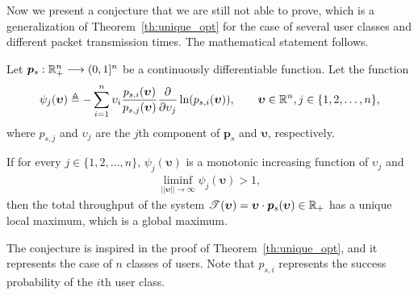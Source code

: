 Now we present a conjecture that we are still not able to prove, which is a generalization of Theorem~\ref{th:unique_opt} for the case of several user classes and different packet transmission times.
%
The mathematical statement follows.

\begin{conjecture} \label{conj:unique_opt}
    Let $\bm{p}_s: {\mathbb R}_+^n \longrightarrow (0,1]^n$ be a continuously differentiable function.
    Let the function
    \begin{align*}
        \psi_j(\bm{\upsilon}) \triangleq - \sum_{i=1}^n \upsilon_i \frac{p_{s,i}(\bm{\upsilon})}{p_{s,j}(\bm{\upsilon})} \frac{\partial}{\partial \upsilon_j} \ln(p_{s,i}(\bm{\upsilon})), \qquad \bm{\upsilon}\in{\mathbb R}^n, j\in\{1,2,\dots,n\},
    \end{align*}
    where $p_{s,j}$ and $\upsilon_j$ are the $j$th component of $\bm{p}_{s}$ and $\bm{\upsilon}$, respectively.
    
    If for every $j\in\{1,2,\dots,n\}$, $\psi_j(\bm{\upsilon})$ is a monotonic increasing function of $\upsilon_j$ and
    \begin{align*}
        \liminf_{||\bm{\upsilon}||\to\infty} \psi_j(\bm{\upsilon}) > 1,%
    \end{align*}%
    then the total throughput of the system $\mathscr{T}(\bm{\upsilon}) = \bm{\upsilon} \cdot \bm{p}_s(\bm{\upsilon}) \in {\mathbb R}_+$ has a unique local maximum, which is a global maximum.
\end{conjecture}

The conjecture is inspired in the proof of Theorem~\ref{th:unique_opt}, and it represents the case of $n$ classes of users.
%
Note that $p_{s,i}$ represents the success probability of the $i$th user class.




